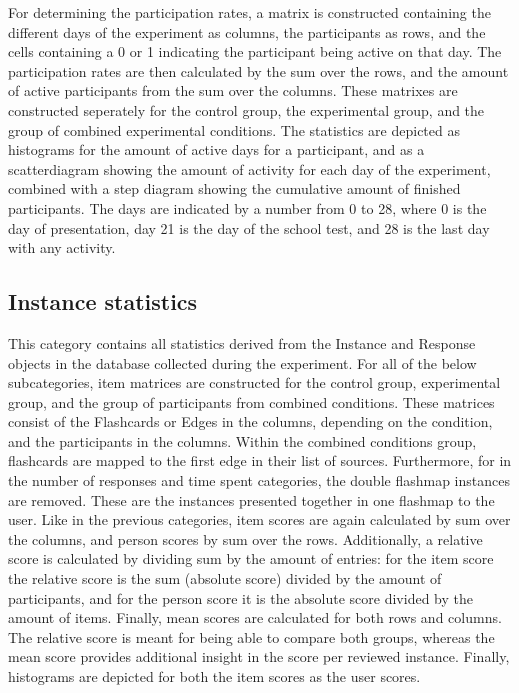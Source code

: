 For determining the participation rates, a matrix is constructed containing the different days of the experiment as columns, the participants as rows, and the cells containing a 0 or 1 indicating the participant being active on that day. The participation rates are then calculated by the sum over the rows, and the amount of active participants from the sum over the columns. These matrixes are constructed seperately for the control group, the experimental group, and the group of combined experimental conditions. The statistics are depicted as histograms for the amount of active days for a participant, and as a scatterdiagram showing the amount of activity for each day of the experiment, combined with a step diagram showing the cumulative amount of finished participants. The days are indicated by a number from 0 to 28, where 0 is the day of presentation, day 21 is the day of the school test, and 28 is the last day with any activity.

\subsection{Instance statistics}

This category contains all statistics derived from the Instance and Response objects in the database collected during the experiment. For all of the below subcategories, item matrices are constructed for the control group, experimental group, and the group of participants from combined conditions. These matrices consist of the Flashcards or Edges in the columns, depending on the condition, and the participants in the columns. Within the combined conditions group, flashcards are mapped to the first edge in their list of sources. Furthermore, for in the number of responses and time spent categories, the double flashmap instances are removed. These are the instances presented together in one flashmap to the user. Like in the previous categories, item scores are again calculated by sum over the columns, and person scores by sum over the rows. Additionally, a relative score is calculated by dividing sum by the amount of entries: for the item score the relative score is the sum (absolute score) divided by the amount of participants, and for the person score it is the absolute score divided by the amount of items. Finally, mean scores are calculated for both rows and columns. The relative score is meant for being able to compare both groups, whereas the mean score provides additional insight in the score per reviewed instance. Finally, histograms are depicted for both the item scores as the user scores.

